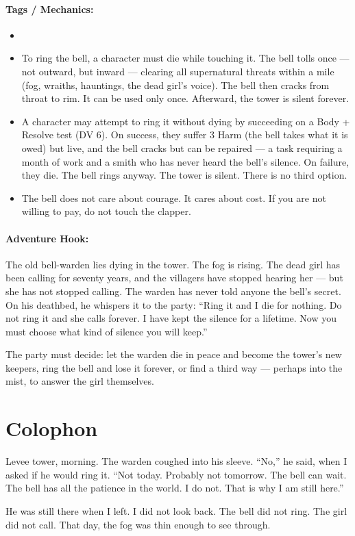\paragraph{Tags / Mechanics:}
\begin{itemize}
\item [WARD] [SILENCE] [SACRIFICE] [BANISH]
\item To ring the bell, a character must die while touching it. The bell tolls once --- not outward, but inward --- clearing all supernatural threats within a mile (fog, wraiths, hauntings, the dead girl's voice). The bell then cracks from throat to rim. It can be used only once. Afterward, the tower is silent forever.
\item A character may attempt to ring it without dying by succeeding on a Body + Resolve test (DV 6). On success, they suffer 3 Harm (the bell takes what it is owed) but live, and the bell cracks but can be repaired --- a task requiring a month of work and a smith who has never heard the bell's silence. On failure, they die. The bell rings anyway. The tower is silent. There is no third option.
\item The bell does not care about courage. It cares about cost. If you are not willing to pay, do not touch the clapper.
\end{itemize}

\paragraph{Adventure Hook:}
The old bell-warden lies dying in the tower. The fog is rising. The dead girl has been calling for seventy years, and the villagers have stopped hearing her --- but she has not stopped calling. The warden has never told anyone the bell's secret. On his deathbed, he whispers it to the party: ``Ring it and I die for nothing. Do not ring it and she calls forever. I have kept the silence for a lifetime. Now you must choose what kind of silence you will keep.''

The party must decide: let the warden die in peace and become the tower's new keepers, ring the bell and lose it forever, or find a third way --- perhaps into the mist, to answer the girl themselves.

\section*{Colophon}
Levee tower, morning. The warden coughed into his sleeve. ``No,'' he said, when I asked if he would ring it. ``Not today. Probably not tomorrow. The bell can wait. The bell has all the patience in the world. I do not. That is why I am still here.''

He was still there when I left. I did not look back. The bell did not ring. The girl did not call. That day, the fog was thin enough to see through.